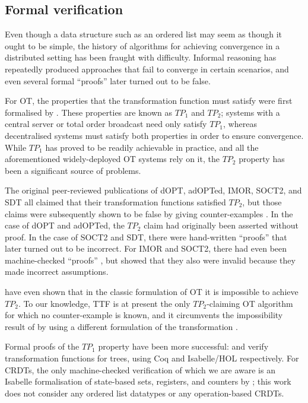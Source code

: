 \subsection{Formal verification}\label{sect.related.verification}

Even though a data structure such as an ordered list may seem as though it ought to be simple, the
history of algorithms for achieving convergence in a distributed setting has been fraught with
difficulty. Informal reasoning has repeatedly produced approaches that fail to converge in certain
scenarios, and even several formal ``proofs'' later turned out to be false.

For OT, the properties that the transformation function must satisfy were first formalised by
\citet{Ressel:1996wx}. These properties are known as $\mathit{TP}_1$ and $\mathit{TP}_2$; systems
with a central server or total order broadcast need only satisfy $\mathit{TP}_1$, whereas
decentralised systems must satisfy both properties in order to ensure convergence. While
$\mathit{TP}_1$ has proved to be readily achievable in practice, and all the aforementioned
widely-deployed OT systems rely on it, the $\mathit{TP}_2$ property has been a significant source of
problems.

The original peer-reviewed publications of dOPT, adOPTed, IMOR, SOCT2, and SDT all claimed that
their transformation functions satisfied $\mathit{TP}_2$, but those claims were subsequently shown
to be false by giving counter-examples \cite{Imine:2003ks,Imine:2006kn,Oster:2005vi}. In the case of
dOPT and adOPTed, the $\mathit{TP}_2$ claim had originally been asserted without proof. In the case
of SOCT2 and SDT, there were hand-written ``proofs'' that later turned out to be incorrect. For IMOR
and SOCT2, there had even been machine-checked ``proofs'' \cite{Imine:2003ks}, but
\citet{Oster:2005vi} showed that they also were invalid because they made incorrect assumptions.

\citet{Randolph:2015gj} have even shown that in the classic formulation of OT it is impossible to
achieve $\mathit{TP}_2$. To our knowledge, TTF is at present the only $\mathit{TP}_2$-claiming OT
algorithm for which no counter-example is known, and it circumvents the impossibility result of
\citet{Randolph:2015gj} by using a different formulation of the transformation
\cite{Oster:2006tr,Levien:2016wz}.

Formal proofs of the $\mathit{TP}_1$ property have been more successful: \citet{Sinchuk:2016cf} and
\citet{Jungnickel:2015ua} verify transformation functions for trees, using Coq and Isabelle/HOL
respectively. For CRDTs, the only machine-checked verification of which we are aware is an Isabelle
formalisation of state-based sets, registers, and counters by \citet{Zeller:2014fl}; this work does
not consider any ordered list datatypes or any operation-based CRDTs.

